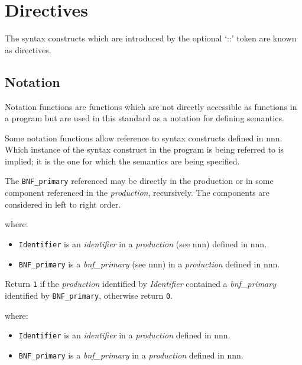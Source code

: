 \chapter{Directives}\label{directives}

The syntax constructs which are introduced by the optional `::' token
are known as directives.

\section{Notation}\label{notation}

Notation functions are functions which are not directly accessible as
functions in a program but are used in this standard as a notation for
defining semantics.

Some notation functions allow reference to syntax constructs defined in
nnn. Which instance of the syntax construct in the program is being
referred to is implied; it is the one for which the semantics are being
specified.

The \texttt{BNF\_primary} referenced may be directly in the production
or in some component referenced in the \emph{production}, recursively.
The components are considered in left to right order.



where:

\begin{itemize}
\tightlist
\item
  \texttt{Identifier} is an \emph{identifier} in a \emph{production}
  (see nnn) defined in nnn.
\item
  \texttt{BNF\_primary} is a \emph{bnf\_primary} (see nnn) in a
  \emph{production} defined in nnn.
\end{itemize}

Return \texttt{\textquotesingle{}1\textquotesingle{}} if the
\emph{production} identified by \emph{Identifier} contained a
\emph{bnf\_primary} identified by \texttt{BNF\_primary}, otherwise
return \texttt{\textquotesingle{}0\textquotesingle{}}.



where:

\begin{itemize}
\tightlist
\item
  \texttt{Identifier} is an \emph{identifier} in a \emph{production}
  defined in nnn.
\item
  \texttt{BNF\_primary} is a \emph{bnf\_primary} in a \emph{production}
  defined in nnn.
\end{itemize}

